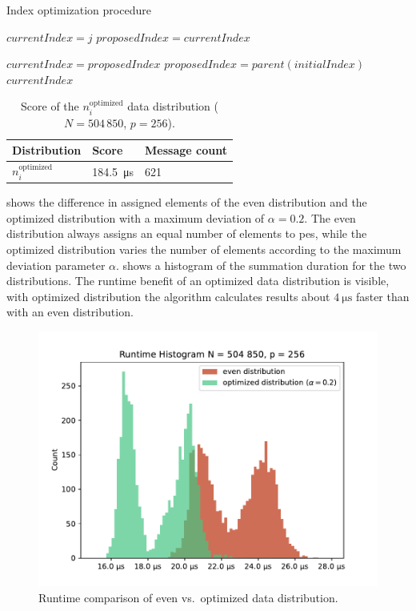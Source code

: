 \begin{algorithm}
\caption{Index optimization procedure}\label{algo:optimizeIndex}
\DontPrintSemicolon
\SetAlgoLined
{}

$currentIndex = j$\;
$proposedIndex = currentIndex$\;

 {
	$currentIndex = proposedIndex$\;
	$proposedIndex = parent(initialIndex)$\;
}
\Return $currentIndex$\;
\end{algorithm}


\begin{table}
\centering
\caption{Score of the $n_i^\textrm{optimized}$ data distribution ($N = 504\,850$, $p=256$).}
\label{table:OptimizedDistributionScore}
\begin{tabular}{l|l|l}
Distribution & Score & Message count \\
\hline
$n_i^\textrm{optimized}$ & \SI{184.5}{\micro\second} & 621
\end{tabular}
\end{table}

 shows the difference in assigned elements of the even distribution and the optimized distribution with a maximum deviation of $\alpha = 0.2$.
The even distribution always assigns an equal number of elements to \glspl{pe}, while the optimized distribution varies the number of elements according to the maximum deviation parameter $\alpha$.
 shows a histogram of the summation duration for the two distributions.
The runtime benefit of an optimized data distribution is visible, with optimized distribution the algorithm calculates results about $\SI{4}{\micro\second}$ faster than with  an even distribution.

\begin{figure}
\centering
\includegraphics[scale=0.75]{figures/distribution_experiment}
\caption{Runtime comparison of even vs.\ optimized data distribution.}
\label{fig:distribution_runtimes}
\end{figure}

